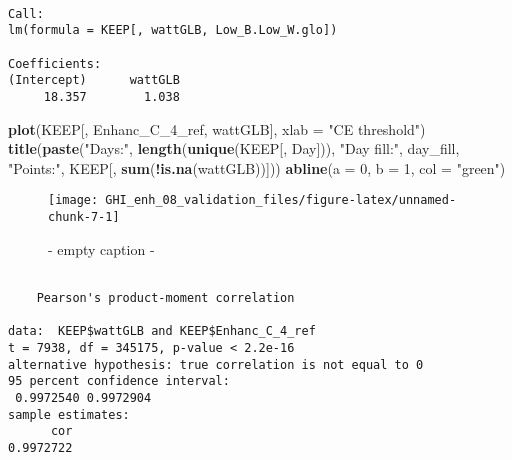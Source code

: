 \documentclass[
  10pt,
  a4paper,oneside]{article}
\newenvironment{Shaded}{\begin{snugshade}}{\end{snugshade}}
\newcommand{\AttributeTok}[1]{\textcolor[rgb]{0.13,0.29,0.53}{#1}}
\newcommand{\DecValTok}[1]{\textcolor[rgb]{0.00,0.00,0.81}{#1}}
\newcommand{\FunctionTok}[1]{\textcolor[rgb]{0.13,0.29,0.53}{\textbf{#1}}}
\newcommand{\NormalTok}[1]{#1}
\newcommand{\SpecialCharTok}[1]{\textcolor[rgb]{0.81,0.36,0.00}{\textbf{#1}}}
\newcommand{\StringTok}[1]{\textcolor[rgb]{0.31,0.60,0.02}{#1}}
\begin{document}
\begin{verbatim}

Call:
lm(formula = KEEP[, wattGLB, Low_B.Low_W.glo])

Coefficients:
(Intercept)      wattGLB  
     18.357        1.038  
\end{verbatim}

\newpage

\begin{Shaded}
\begin{Highlighting}[]
\FunctionTok{plot}\NormalTok{(KEEP[, Enhanc\_C\_4\_ref, wattGLB], }\AttributeTok{xlab =} \StringTok{"CE threshold"}\NormalTok{)}
\FunctionTok{title}\NormalTok{(}\FunctionTok{paste}\NormalTok{(}\StringTok{"Days:"}\NormalTok{, }\FunctionTok{length}\NormalTok{(}\FunctionTok{unique}\NormalTok{(KEEP[, Day])), }\StringTok{"Day fill:"}\NormalTok{, day\_fill, }\StringTok{"Points:"}\NormalTok{, KEEP[, }\FunctionTok{sum}\NormalTok{(}\SpecialCharTok{!}\FunctionTok{is.na}\NormalTok{(wattGLB))]))}
\FunctionTok{abline}\NormalTok{(}\AttributeTok{a =} \DecValTok{0}\NormalTok{, }\AttributeTok{b =} \DecValTok{1}\NormalTok{, }\AttributeTok{col =} \StringTok{"green"}\NormalTok{)}
\end{Highlighting}
\end{Shaded}

\begin{figure}[H]

{\centering \texttt{[image: GHI\_enh\_08\_validation\_files/figure-latex/unnamed-chunk-7-1]} 

}

\caption{ - empty caption - }\label{fig:unnamed-chunk-7}
\end{figure}

\begin{Shaded}
\end{Shaded}

\begin{verbatim}

    Pearson's product-moment correlation

data:  KEEP$wattGLB and KEEP$Enhanc_C_4_ref
t = 7938, df = 345175, p-value < 2.2e-16
alternative hypothesis: true correlation is not equal to 0
95 percent confidence interval:
 0.9972540 0.9972904
sample estimates:
      cor 
0.9972722 
\end{verbatim}
\end{document}
